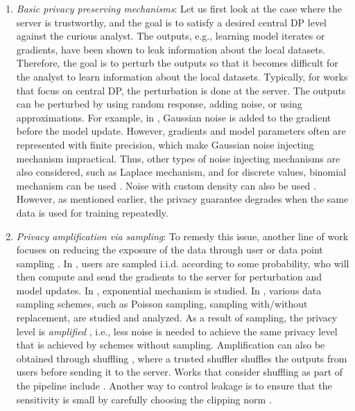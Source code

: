 \begin{enumerate}
    \item \textit{Basic privacy preserving mechanisms}: Let us first look at the case where the server is trustworthy, and the goal is to satisfy a desired central DP level against the curious analyst. The outputs, e.g., learning model iterates or gradients, have been shown to leak information about the local datasets. Therefore, the goal is to perturb the outputs so that it becomes difficult for the analyst to learn information about the local datasets. Typically, for works that focus on central DP, the perturbation is done at the server. The outputs can be perturbed by using random response, adding noise, or using approximations. For example, in \cite{Abadi2016}, Gaussian noise is added to the gradient before the model update. However, gradients and model parameters often are represented with finite precision, which make Gaussian noise injecting mechanism impractical. Thus, other types of noise injecting mechanisms are also considered, such as Laplace mechanism, and for discrete values, binomial mechanism can be used \cite{Agarwal2018cpSGD}. Noise with custom density can also be used \cite{Song2013SGD}. However, as mentioned earlier, the privacy guarantee degrades when the same data is used for training repeatedly. 
    
    \item \textit{Privacy amplification via sampling}: 
To remedy this issue, another line of work focuses on reducing the exposure of the data through user \cite{McMahan2018Recurrent, Asoodeh2020InfoTheory} or data point sampling \cite{Abadi2016, Bassily2014PrivateERM, Balle2018AmpSubsampling, Heikkila2020DPcrossSilo}. In \cite{McMahan2018Recurrent}, users are sampled i.i.d. according to some probability, who will then compute and send the gradients to the server for perturbation and model updates. In \cite{Bassily2014PrivateERM}, exponential mechanism is studied. In \cite{Balle2018AmpSubsampling}, various data sampling schemes, such as Poisson sampling, sampling with/without replacement, are studied and analyzed. As a result of sampling, the privacy level is \textit{amplified} \cite{Balle2018AmpSubsampling}, i.e., less noise is needed to achieve the same privacy level that is achieved by schemes without sampling. Amplification can also be obtained through shuffling \cite{Erlingsson2019Shuffling}, where a trusted shuffler shuffles the outputs from users before sending it to the server. Works that consider shuffling as part of the pipeline include \cite{Bittau2017PROCHLO, Cheu2018Distributed}. Another way to control leakage is to ensure that the sensitivity is small by carefully choosing the clipping norm \cite{Thakkar2019AdaptiveClipping}.


\end{enumerate}
